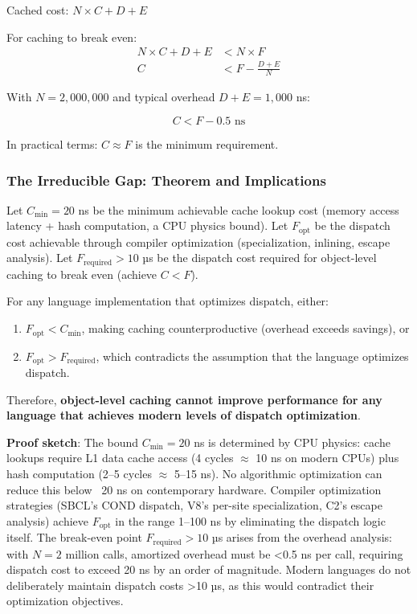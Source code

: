 \documentclass[sigplan,final,acmsmall,review,screen]{acmart}
\begin{document}
Cached cost: $N \times C + D + E$

For caching to break even:
\begin{align}
N \times C + D + E &< N \times F \\
C &< F - \frac{D + E}{N}
\end{align}

With $N = 2,000,000$ and typical overhead $D + E = 1,000$ ns:

\begin{equation}
C < F - 0.5 \text{ ns}
\end{equation}

In practical terms: $C \approx F$ is the minimum requirement.

\subsubsection{The Irreducible Gap: Theorem and Implications}

\begin{theorem}
Let $C_{\text{min}} = 20$ ns be the minimum achievable cache lookup cost (memory access latency + hash computation, a CPU physics bound).
Let $F_{\text{opt}}$ be the dispatch cost achievable through compiler optimization (specialization, inlining, escape analysis).
Let $F_{\text{required}} > 10$ µs be the dispatch cost required for object-level caching to break even (achieve $C < F$).

For any language implementation that optimizes dispatch, either:
\begin{enumerate}
  \item $F_{\text{opt}} < C_{\text{min}}$, making caching counterproductive (overhead exceeds savings), or
  \item $F_{\text{opt}} > F_{\text{required}}$, which contradicts the assumption that the language optimizes dispatch.
\end{enumerate}

Therefore, \textbf{object-level caching cannot improve performance for any language that achieves modern levels of dispatch optimization}.
\end{theorem}

\textbf{Proof sketch}: The bound $C_{\text{min}} = 20$ ns is determined by CPU physics: cache lookups require L1 data cache access (4 cycles $\approx$ 10 ns on modern CPUs) plus hash computation (2--5 cycles $\approx$ 5--15 ns). No algorithmic optimization can reduce this below ~20 ns on contemporary hardware. Compiler optimization strategies (SBCL's COND dispatch, V8's per-site specialization, C2's escape analysis) achieve $F_{\text{opt}}$ in the range 1--100 ns by eliminating the dispatch logic itself. The break-even point $F_{\text{required}} > 10$ µs arises from the overhead analysis: with $N = 2$ million calls, amortized overhead must be <0.5 ns per call, requiring dispatch cost to exceed 20 ns by an order of magnitude. Modern languages do not deliberately maintain dispatch costs >10 µs, as this would contradict their optimization objectives.
\end{document}
